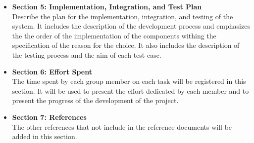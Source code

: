 \begin{itemize}
    \item \textbf{Section 5: Implementation, Integration, and Test Plan}
    \\Describe the plan for the implementation, integration, and testing of the system. It includes the description of the development process and emphasizes the
    the order of the implementation of the components withing the specification of the reason for the choice. It also includes the description of the testing
    process and the aim of each test case.
    \item \textbf{Section 6: Effort Spent}
    \\The time spent by each group member on each task will be registered in this section. It will be used to present the effort dedicated 
    by each member and to present the progress of the development of the project.
    \item \textbf{Section 7: References}
    \\ The other references that not include in the reference documents will be added in this section.
\end{itemize}